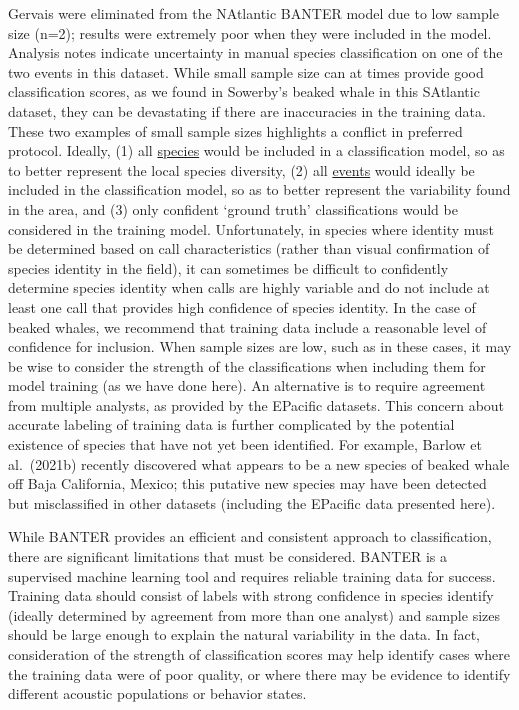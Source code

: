 \documentclass[
  authoryear,
  preprint,
  3p]{elsarticle}
\begin{document}
Gervais were eliminated from the NAtlantic BANTER model due to low
sample size (n=2); results were extremely poor when they were included
in the model. Analysis notes indicate uncertainty in manual species
classification on one of the two events in this dataset. While small
sample size can at times provide good classification scores, as we found
in Sowerby's beaked whale in this SAtlantic dataset, they can be
devastating if there are inaccuracies in the training data. These two
examples of small sample sizes highlights a conflict in preferred
protocol. Ideally, (1) all \uline{species} would be included in a
classification model, so as to better represent the local species
diversity, (2) all \uline{events} would ideally be included in the
classification model, so as to better represent the variability found in
the area, and (3) only confident `ground truth' classifications would be
considered in the training model. Unfortunately, in species where
identity must be determined based on call characteristics (rather than
visual confirmation of species identity in the field), it can sometimes
be difficult to confidently determine species identity when calls are
highly variable and do not include at least one call that provides high
confidence of species identity. In the case of beaked whales, we
recommend that training data include a reasonable level of confidence
for inclusion. When sample sizes are low, such as in these cases, it may
be wise to consider the strength of the classifications when including
them for model training (as we have done here). An alternative is to
require agreement from multiple analysts, as provided by the EPacific
datasets. This concern about accurate labeling of training data is
further complicated by the potential existence of species that have not
yet been identified. For example, Barlow et al.~(2021b) recently
discovered what appears to be a new species of beaked whale off Baja
California, Mexico; this putative new species may have been detected but
misclassified in other datasets (including the EPacific data presented
here).

While BANTER provides an efficient and consistent approach to
classification, there are significant limitations that must be
considered. BANTER is a supervised machine learning tool and requires
reliable training data for success. Training data should consist of
labels with strong confidence in species identify (ideally determined by
agreement from more than one analyst) and sample sizes should be large
enough to explain the natural variability in the data. In fact,
consideration of the strength of classification scores may help identify
cases where the training data were of poor quality, or where there may
be evidence to identify different acoustic populations or behavior
states.
\end{document}
